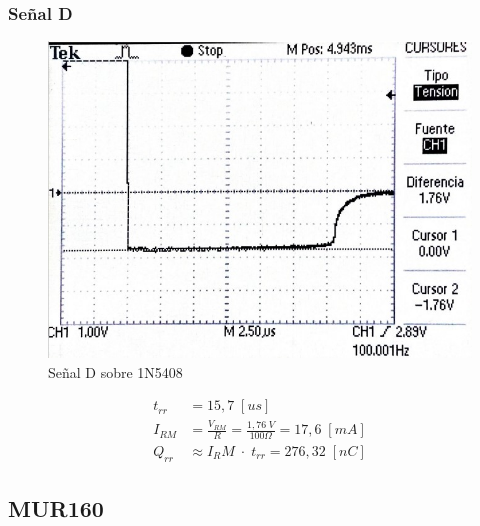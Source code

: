 \documentclass{article}
\begin{document}
\subsubsection{Señal D}
\begin{figure}[h!]
 \begin{center}
	\includegraphics[scale=0.5]{imagenes/1N5408_D.jpg} 
	\caption{Señal D sobre 1N5408}
 \end{center}
\end{figure}
%
\begin{align*}
	t_{rr} &= 15,7 \; [us] \\
	I_{RM}	&= \frac{V_{RM}}{R} = \frac{1,76 \; V}{100 \Omega} = 17,6 \; [mA] \\
	Q_{rr}	&\approx {I_RM} \; \cdot \; t_{rr} = 276,32 \; [nC]
\end{align*}
%
\subsection{MUR160}
\end{document}

